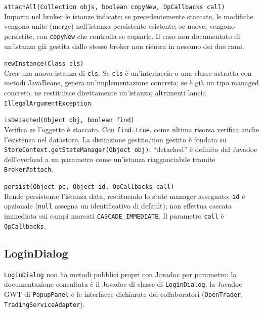 \bigskip
\texttt{attachAll(Collection objs, boolean copyNew, OpCallbacks call)}\\[6pt]
Importa nel broker le istanze indicate: se precedentemente staccate, le modifiche vengono
unite (merge) nell'istanza persistente esistente; se nuove, vengono persistite, con
\texttt{copyNew} che controlla se copiarle. Il caso non documentato di un'istanza già gestita
dallo stesso broker non rientra in nessuno dei due rami.

\bigskip
\texttt{newInstance(Class cls)}\\[6pt]
Crea una nuova istanza di \texttt{cls}. Se \texttt{cls} è un'interfaccia o una classe astratta
con metodi JavaBeans, genera un'implementazione concreta; se è già un tipo managed concreto, ne
restituisce direttamente un'istanza; altrimenti lancia \texttt{IllegalArgumentException}.

\bigskip
\texttt{isDetached(Object obj, boolean find)}\\[6pt]
Verifica se l'oggetto è staccato. Con \texttt{find=true}, come ultima risorsa verifica anche
l'esistenza nel datastore. La distinzione gestito/non gestito è fondata su
\texttt{StoreContext.getStateManager(Object obj)}; ``detached'' è definito dal Javadoc
dell'overload a un parametro come un'istanza riagganciabile tramite \texttt{Broker\#attach}.

\bigskip
\texttt{persist(Object pc, Object id, OpCallbacks call)}\\[6pt]
Rende persistente l'istanza data, restituendo lo state manager assegnato; \texttt{id} è
opzionale (\texttt{null} assegna un identificativo di default); non effettua cascata immediata
sui campi marcati \texttt{CASCADE\_IMMEDIATE}. Il parametro \texttt{call} è \texttt{OpCallbacks}.

\subsection{LoginDialog}

\texttt{LoginDialog} non ha metodi pubblici propri con
Javadoc per parametro: la documentazione consultata è il Javadoc di classe di
\texttt{LoginDialog}, la Javadoc GWT di \texttt{PopupPanel} e le interfacce dichiarate dei collaboratori (\texttt{OpenTrader},
\texttt{TradingServiceAdapter}).
